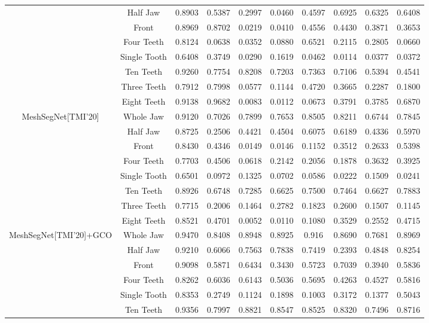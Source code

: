 \documentclass[letterpaper, 10 pt, conference]{ieeeconf}  %
\begin{document}
\begin{table*}[htbp]
\begin{tabular}{|c|c|c|c|c |c |c |c |c |c|}
& Half Jaw & 0.8903 & 0.5387 & 0.2997 & 0.0460 & 0.4597 & 0.6925 & 0.6325 & 0.6408 \\
& Front & 0.8969 & 0.8702 & 0.0219 & 0.0410 & 0.4556 & 0.4430 & 0.3871 & 0.3653\\
& Four Teeth & 0.8124 & 0.0638 & 0.0352 & 0.0880 & 0.6521 & 0.2115 & 0.2805 & 0.0660\\
& Single Tooth & 0.6408 & 0.3749 & 0.0290 & 0.1619 & 0.0462 & 0.0114 & 0.0377 & 0.0372\\
& Ten Teeth & 0.9260& 0.7754& 0.8208& 0.7203& 0.7363& 0.7106& 0.5394& 0.4541\\
& Three Teeth & 0.7912& 0.7998& 0.0577& 0.1144& 0.4720& 0.3665& 0.2287& 0.1800\\
& Eight Teeth & 0.9138& 0.9682& 0.0083& 0.0112& 0.0673& 0.3791& 0.3785& 0.6870\\
\hline
{MeshSegNet[TMI'20]} & Whole Jaw  &  0.9120 & 0.7026 & 0.7899 & 0.7653 & 0.8505 & 0.8211 & 0.6744 & 0.7845\\
& Half Jaw & 0.8725 & 0.2506 & 0.4421 & 0.4504 & 0.6075 & 0.6189 & 0.4336 & 0.5970 \\
& Front & 0.8430 & 0.4346 & 0.0149 & 0.0146 & 0.1152 & 0.3512 & 0.2633 & 0.5398\\
& Four Teeth &  0.7703 & 0.4506 & 0.0618 & 0.2142 & 0.2056 & 0.1878 & 0.3632 & 0.3925\\
& Single Tooth & 0.6501 & 0.0972 & 0.1325 & 0.0702 & 0.0586 & 0.0222 & 0.1509 & 0.0241 \\
& Ten Teeth & 0.8926& 0.6748& 0.7285& 0.6625& 0.7500& 0.7464& 0.6627& 0.7883\\
& Three Teeth & 0.7715& 0.2006& 0.1464& 0.2782& 0.1823& 0.2600& 0.1507& 0.1145\\
& Eight Teeth & 0.8521& 0.4701& 0.0052& 0.0110& 0.1080& 0.3529& 0.2552& 0.4715\\
\hline
{MeshSegNet[TMI'20]+GCO} & Whole Jaw & 0.9470 & 0.8408 & 0.8948 & 0.8925 & 0.916 & 0.8690 & 0.7681 & 0.8969  \\
& Half Jaw & 0.9210 & 0.6066 & 0.7563 & 0.7838 & 0.7419 & 0.2393 & 0.4848 & 0.8254\\
& Front & 0.9098 & 0.5871 & 0.6434 & 0.3430 & 0.5723 & 0.7039 & 0.3940 & 0.5836 \\
& Four Teeth & 0.8262 & 0.6036 & 0.6143 & 0.5036 & 0.5695 & 0.4263 & 0.4527 & 0.5816\\
& Single Tooth & 0.8353 & 0.2749 & 0.1124 & 0.1898 & 0.1003 & 0.3172 & 0.1377 & 0.5043 \\
& Ten Teeth & 0.9356& 0.7997& 0.8821& 0.8547& 0.8525& 0.8320& 0.7496& 0.8716\\

\end{tabular}
\end{table*}
\end{document}
